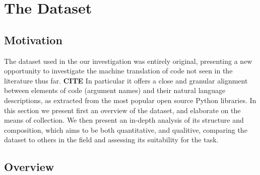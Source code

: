 \chapter{The Dataset}
\label{the_dataset}



\section{Motivation}





The dataset used in the our investigation was entirely original, presenting a new opportunity to investigate the machine translation of code not seen in the literature thus far. \textbf{CITE}
In particular it offers a close and granular alignment between elements of code (argument names) and their natural language descriptions, as extracted from the most popular open source Python libraries.
In this section we present first an overview of the dataset, and elaborate on  the means of collection. 
We then present an in-depth analysis of its structure and composition, which aims to be both quantitative, and qualitive, comparing the dataset to others in the field and assessing its suitability for the task. 

\section{Overview} %
\label{sec:overview}

